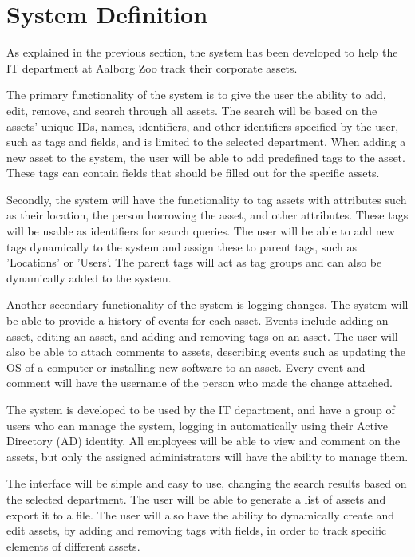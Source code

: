 \section{System Definition}
As explained in the previous section, the system has been developed to help the IT department at Aalborg Zoo track their corporate assets.
\par
The primary functionality of the system is to give the user the ability to add, edit, remove, and search through all assets. The search will be based on the assets' unique IDs, names, identifiers, and other identifiers specified by the user, such as tags and fields, and is limited to the selected department. When adding a new asset to the system, the user will be able to add predefined tags to the asset. These tags can contain fields that should be filled out for the specific assets.
\par
Secondly, the system will have the functionality to tag assets with attributes such as their location, the person borrowing the asset, and other attributes. These tags will be usable as identifiers for search queries. The user will be able to add new tags dynamically to the system and assign these to parent tags, such as 'Locations' or 'Users'. The parent tags will act as tag groups and can also be dynamically added to the system. 
\par
Another secondary functionality of the system is logging changes. The system will be able to provide a history of events for each asset. Events include adding an asset, editing an asset, and adding and removing tags on an asset. The user will also be able to attach comments to assets, describing events such as updating the OS of a computer or installing new software to an asset. Every event and comment will have the username of the person who made the change attached.
\par
The system is developed to be used by the IT department, and have a group of users who can manage the system, logging in automatically using their Active Directory (AD) identity. All employees will be able to view and comment on the assets, but only the assigned administrators will have the ability to manage them. 
\par
The interface will be simple and easy to use, changing the search results based on the selected department. The user will be able to generate a list of assets and export it to a file. The user will also have the ability to dynamically create and edit assets, by adding and removing tags with fields, in order to track specific elements of different assets.
